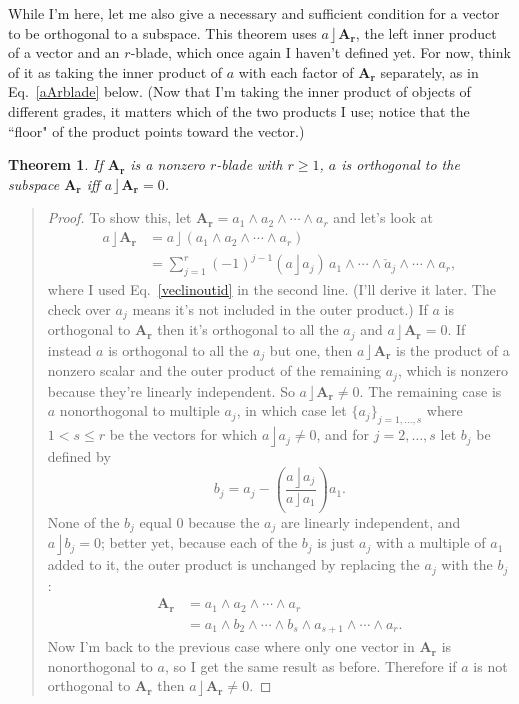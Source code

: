 \documentclass{utarticle}
\newcommand{\bl}[1]{\ensuremath{\bm{#1}}}
\DeclareMathOperator{\lin}{\rfloor}
\DeclareMathOperator{\out}{\wedge}
\newtheorem{thm}{Theorem}
\newcommand{\bp}{\begin{quotation} \begin{proof}}
\newcommand{\ep}{\end{proof} \end{quotation}}
\begin{document}
While I'm here, let me also give a necessary and sufficient condition 
for a vector to be orthogonal to a subspace.  This theorem uses $a \lin \bl{A_r}$, the
left inner product of a vector and an $r$-blade, which once again I haven't defined yet.
For now, think of it as taking the inner product of $a$ with each factor of \bl{A_r} 
separately, as in Eq.~\eqref{aArblade} below. (Now that I'm taking the inner product 
of objects of different grades, it matters which of the two products I use; notice that the 
``floor" of the product points toward the vector.)
\begin{thm}
If \bl{A_r} is a nonzero $r$-blade with $r \geq 1$, $a$ is orthogonal to the subspace \bl{A_r} 
iff $a \lin \bl{A_r} = 0$.  
\label{vecorthtoA}
\end{thm}
\bp
To show this, let $\bl{A_r} = a_1 \out a_2 \out \dotsb \out a_r$ 
and let's look at 
\begin{align}
a \lin \bl{A_r}  & = a \lin (a_1 \out a_2 \out \dotsb \out a_r) \nonumber \\
 & = \sum_{j=1}^r (-1)^{j-1} (a \lin a_j)\, a_1 \out \dotsb \out 
              \check{a}_j \out \dotsb \out a_r,
\label{aArblade}
\end{align}
where I used Eq.~\eqref{veclinoutid} in the second line.  (I'll derive it later.  
The check over $a_j$ means it's not included in the outer product.)  
If $a$ is orthogonal to \bl{A_r} then it's orthogonal to all the $a_j$ and $a \lin 
\bl{A_r} = 0$.  If instead $a$ is orthogonal to all the $a_j$ but one, then 
$a \lin \bl{A_r}$ is the product of a nonzero scalar and the outer product 
of the remaining $a_j$, which is nonzero because they're linearly independent.  
So $a \lin \bl{A_r} \neq 0$. The remaining case is $a$ nonorthogonal to multiple 
$a_j$, in which case let $\{a_j\}_{j=1,\dotsc,s}$ where $1 < s \leq r$ be the vectors 
for which $a \lin a_j \neq 0$, and for $j=2,\dotsc,s$ let $b_j$ be defined by
\begin{equation}
b_j = a_j - \left(\frac{a \lin a_j}{a \lin a_1}\right) a_1.
\end{equation}
None of the $b_j$ equal $0$ because the $a_j$ are linearly independent, and 
$a \lin b_j = 0$; better yet, because each of the $b_j$ is just $a_j$ with 
a multiple of $a_1$ added to it, the outer product is unchanged by replacing 
the $a_j$ with the $b_j$:
\begin{align}
\bl{A_r} & = a_1 \out a_2 \out \dotsb \out a_r \nonumber \\
 & = a_1 \out b_2 \out \dotsb \out b_s \out a_{s+1} \out 
     \dotsb \out a_r.
\end{align}
Now I'm back to the previous case where only one vector in \bl{A_r} is nonorthogonal
to $a$, so I get the same result as before.  Therefore if $a$ is not orthogonal 
to \bl{A_r} then $a \lin \bl{A_r} \neq 0$.
\ep
\end{document}
